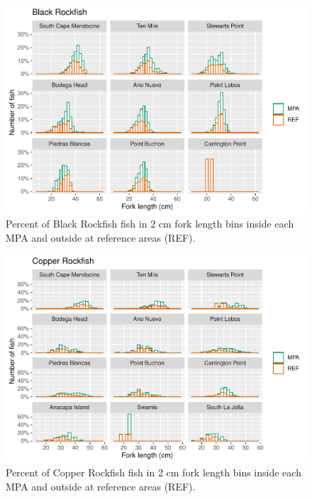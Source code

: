 \documentclass[
]{article}
\begin{document}
\FloatBarrier

\begin{figure}
\centering
\includegraphics{CCRFP_available_data_for_assessments_files/figure-latex/fig-lengths-1.pdf}
\caption{\label{fig:fig-lengths-1}Percent of Black Rockfish fish in 2 cm fork length bins inside each MPA and outside at reference areas (REF).}
\end{figure}

\begin{figure}
\centering
\includegraphics{CCRFP_available_data_for_assessments_files/figure-latex/fig-lengths-2.pdf}
\caption{\label{fig:fig-lengths-2}Percent of Copper Rockfish fish in 2 cm fork length bins inside each MPA and outside at reference areas (REF).}
\end{figure}
\end{document}
